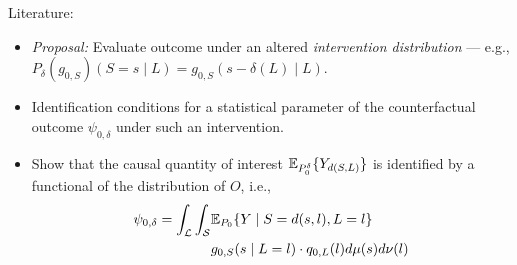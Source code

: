 \documentclass{beamer}
\begin{document}

\begin{frame}[c]{Literature: \cite{diaz2012population, diaz2018stochastic}}

\begin{center}
\begin{itemize}
  \itemsep8pt
  \item \textit{Proposal:} Evaluate outcome under an altered
    \textit{intervention distribution} --- e.g.,
    $P_{\delta}(g_{0,S})(S = s \mid L) = g_{0,S}(s - \delta(L) \mid L)$.
  \item Identification conditions for a statistical parameter of the
    counterfactual outcome $\psi_{0,\delta}$ under such an intervention.
  \item Show that the causal quantity of interest $\mathbb{E}_{P_0^{\delta}}
    \{Y_{d(S, L)}\}$ is identified by a functional of the distribution of $O$,
    i.e.,
    \begin{align*}
      \psi_{0,\delta} = \int_{\mathcal{L}} \int_{\mathcal{S}} &\mathbb{E}_{P_0}
        \{Y \mid S = d(s, l), L = l\} \\ &g_{0, S}(s \mid L = l) \cdot
        q_{0, L}(l) d\mu(s)d\nu(l)
    \end{align*}
\end{itemize}
\end{center}


\end{frame}

\end{document}
